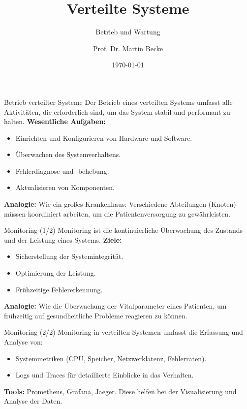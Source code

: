 \documentclass{beamer}
\title{Verteilte Systeme}
\subtitle{Betrieb und Wartung}
\author{Prof. Dr. Martin Becke}
\date{\today}
\begin{document}
\begin{frame}
    \titlepage
\end{frame}

\begin{frame}{Betrieb verteilter Systeme}
    Der Betrieb eines verteilten Systems umfasst alle Aktivitäten, die erforderlich sind, um das System stabil und performant zu halten. \newline
    \textbf{Wesentliche Aufgaben:}
    \begin{itemize}
        \item Einrichten und Konfigurieren von Hardware und Software.
        \item Überwachen des Systemverhaltens.
        \item Fehlerdiagnose und -behebung.
        \item Aktualisieren von Komponenten.
    \end{itemize}
    \textbf{Analogie:} Wie ein großes Krankenhaus: Verschiedene Abteilungen (Knoten) müssen koordiniert arbeiten, um die Patientenversorgung zu gewährleisten.
\end{frame}

\begin{frame}{Monitoring (1/2)}
    Monitoring ist die kontinuierliche Überwachung des Zustands und der Leistung eines Systems. \newline
    \textbf{Ziele:}
    \begin{itemize}
        \item Sicherstellung der Systemintegrität.
        \item Optimierung der Leistung.
        \item Frühzeitige Fehlererkennung.
    \end{itemize}
    \textbf{Analogie:} Wie die Überwachung der Vitalparameter eines Patienten, um frühzeitig auf gesundheitliche Probleme reagieren zu können.
\end{frame}

\begin{frame}{Monitoring (2/2)}
    Monitoring in verteilten Systemen umfasst die Erfassung und Analyse von:
    \begin{itemize}
        \item Systemmetriken (CPU, Speicher, Netzwerklatenz, Fehlerraten).
        \item Logs und Traces für detaillierte Einblicke in das Verhalten.
    \end{itemize}
    \textbf{Tools:} Prometheus, Grafana, Jaeger. \newline
    Diese helfen bei der Visualisierung und Analyse der Daten.
\end{frame}
\end{document}
